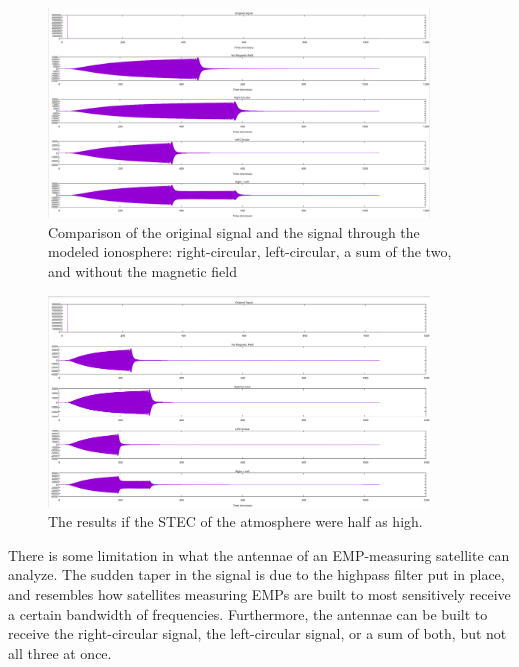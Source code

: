 \documentclass[12pt, reqno]{amsart}
\begin{document}
\begin{figure}[h]
    \centering
    \includegraphics[width= 0.9\textwidth]{signal_final_results.png}
    \caption{\small Comparison of the original signal and the signal through the modeled ionosphere: right-circular, left-circular, a sum of the two, and without the magnetic field}
    \label{fig:signal-final-results}
\end{figure}

 \begin{figure}[h]
    \centering
    \includegraphics[width= 0.9\textwidth]{signal_stec_15.png}
    \caption{\small The results if the STEC of the atmosphere were half as high. }
    \label{fig:signal-final-results}
\end{figure}

\noindent There is some limitation in what the antennae of an EMP-measuring satellite can analyze.
The sudden taper in the signal is due to the highpass filter put in place, and resembles how satellites measuring EMPs are built to most sensitively receive a certain bandwidth of frequencies.
Furthermore, the antennae can be built to receive the right-circular signal, the left-circular signal, or a sum of both, but not all three at once.

\end{document}

